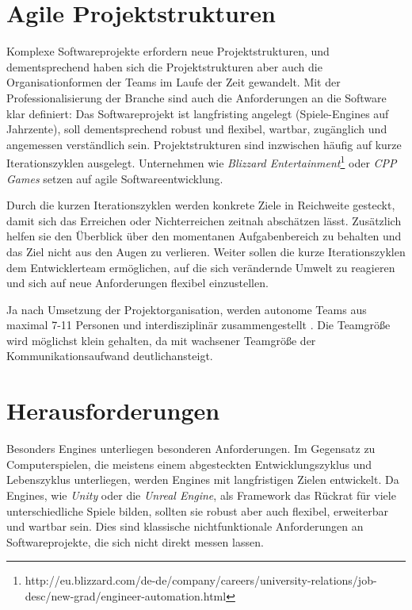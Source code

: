 \section{Agile Projektstrukturen}\label{sec:engines-projektstrukturen}

Komplexe Softwareprojekte erfordern neue Projektstrukturen, und dementsprechend haben sich die Projektstrukturen aber auch die Organisationformen der Teams im Laufe der Zeit gewandelt. Mit der Professionalisierung der Branche sind auch die Anforderungen an die Software klar definiert: Das Softwareprojekt ist langfristing angelegt (Spiele-Engines auf Jahrzente), soll dementsprechend robust und flexibel, wartbar, zugänglich und angemessen verständlich sein. Projektstrukturen sind inzwischen häufig auf kurze Iterationszyklen ausgelegt. Unternehmen wie \textit{Blizzard Entertainment}\footnote{http://eu.blizzard.com/de-de/company/careers/university-relations/job-desc/new-grad/engineer-automation.html} oder \textit{CPP Games} \parencite[Kapitel 8]{keith2010agile} setzen auf agile Softwareentwicklung.

Durch die kurzen Iterationszyklen werden konkrete Ziele in Reichweite gesteckt, damit sich das Erreichen oder Nichterreichen zeitnah abschätzen lässt. Zusätzlich helfen sie den Überblick über den momentanen Aufgabenbereich zu behalten und das Ziel nicht aus den Augen zu verlieren. Weiter sollen die kurze Iterationszyklen dem Entwicklerteam ermöglichen, auf die sich verändernde Umwelt zu reagieren und sich auf neue Anforderungen flexibel einzustellen. 

Ja nach Umsetzung der Projektorganisation, werden autonome Teams aus maximal 7-11 Personen und interdisziplinär zusammengestellt \parencite[Kapitel 8]{keith2010agile}. Die Teamgröße wird möglichst klein gehalten, da mit wachsener Teamgröße der Kommunikationsaufwand deutlich\footnotemark ansteigt.


\section{Herausforderungen}\label{sec:engines-herausforderungen}

Besonders Engines unterliegen besonderen Anforderungen. Im Gegensatz zu Computerspielen, die meistens einem abgesteckten Entwicklungszyklus und Lebenszyklus unterliegen, werden Engines mit langfristigen Zielen entwickelt. Da Engines, wie \textit{Unity} oder die \textit{Unreal Engine}, als Framework das Rückrat für viele unterschiedliche Spiele bilden, sollten sie robust aber auch flexibel, erweiterbar und wartbar sein. Dies sind klassische nichtfunktionale Anforderungen an Softwareprojekte, die sich nicht direkt messen lassen.

